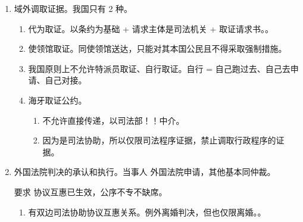 \begin{enumerate}
        \begin{kk}{海牙送达公约}
          \begin{enumerate}
            \item 外国法院 \yjt 该国驻华使领馆 \yjt 司法部！！ \yjt 最高法 \yjt 有关法院 \yjt 受送达人。
            \item 以下理由，被请求方法院不得拒绝送达。
                  \begin{enumerate}
                    \item 有关期限已过。
                    \item 为中国法院专属管辖 \hz 不承认对该事项提起诉讼的权利。
                    \item 未附有被请求方文字译本，但附有英文 \hz 法文译本。
                  \end{enumerate}
            \item 可以拒绝的。不属于职权范围的、危害国家安全。
            \item 受送达人有权拒收未附有中文译本的司法文书。
          \end{enumerate}
        \end{kk}
  \item 域外调取证据。我国只有 2 种。
        \begin{enumerate}
          \item 代为取证。以条约为基础 + 请求主体是司法机关 + 取证请求书。。
          \item 使领馆取证。同使领馆送达，只能对其本国公民且不得采取强制措施。
          \item 我国原则上不允许特派员取证、自行取证。自行 = 自己跑过去、自己去申请、自己对接。
          \item 海牙取证公约。
                \begin{enumerate}
                  \item 不允许直接传递，以司法部！！中介。
                  \item 因为是司法协助，所以仅限司法程序证据，禁止调取行政程序的证据。
                \end{enumerate}
        \end{enumerate}
  \item 外国法院判决的承认和执行。当事人 \hz 外国法院申请，其他基本同仲裁。
        \begin{kk}{要求}
          协议互惠已生效，公序不专不缺席。
          \begin{enumerate}
            \item 有双边司法协助协议互惠关系。例外离婚判决，但也仅限离婚。。

\end{enumerate}
\end{kk}
\end{enumerate}
